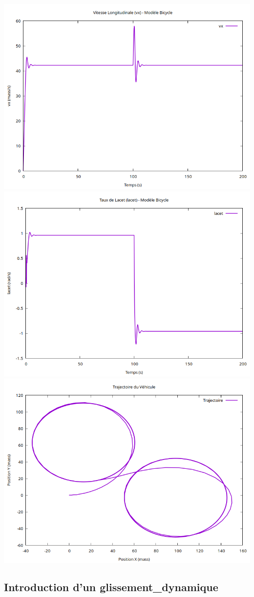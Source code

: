 \begin{center}
\includegraphics[width=0.70\linewidth]{resources/Plots/Etape2/vx_bicycle}
\includegraphics[width=0.70\linewidth]{resources/Plots/Etape2/r_bicycle}
\includegraphics[width=0.70\linewidth]{resources/Plots/Etape2/trajectory}
\end{center}

\subsection{Introduction d'un \gls{glissement_dynamique}}\label{subsec:introduction-dun-glissement-dynamique}


